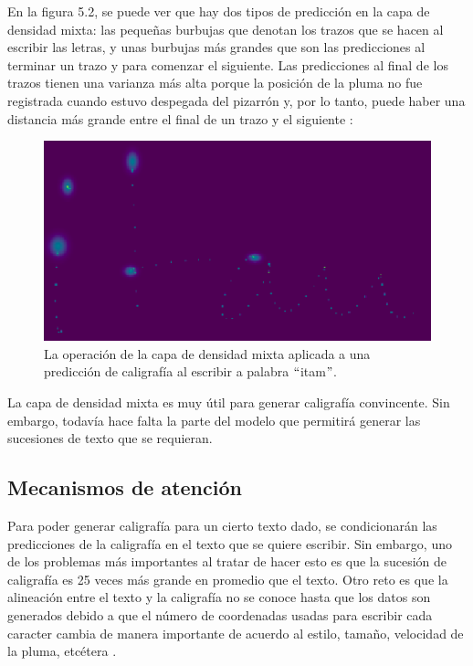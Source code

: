 \vspace{1em}

En la figura 5.2, se puede ver que hay dos tipos de predicción en la capa de densidad mixta: las pequeñas burbujas que denotan los trazos que se hacen al escribir las letras, y unas burbujas más grandes que son las predicciones al terminar un trazo y para comenzar el siguiente. Las predicciones al final de los trazos tienen una varianza más alta porque la posición de la pluma no fue registrada cuando estuvo despegada del pizarrón y, por lo tanto, puede haber una distancia más grande entre el final de un trazo y el siguiente \cite{DBLP:journals/corr/Graves13}:

\begin{figure}[h]
\begin{center}
\includegraphics[width=150mm, scale = 0.8]{./imag/mdn.png}
\end{center}
\caption{La operación de la capa de densidad mixta aplicada a una predicción de caligrafía al escribir a palabra $``$itam$"$.}
\end{figure}

\vspace{1em}

La capa de densidad mixta es muy útil para generar caligrafía convincente. Sin embargo, todavía hace falta la parte del modelo que permitirá generar las sucesiones de texto que se requieran.

\subsection{Mecanismos de atención}
Para poder generar caligrafía para un cierto texto dado, se condicionarán las predicciones de la caligrafía en el texto que se quiere escribir. Sin embargo, uno de los problemas más importantes al tratar de hacer esto es que la sucesión de caligrafía es 25 veces más grande en promedio que el texto. Otro reto es que la alineación entre el texto y la caligrafía no se conoce hasta que los datos son generados debido a que el número de coordenadas usadas para escribir cada caracter cambia de manera importante de acuerdo al estilo, tamaño, velocidad de la pluma, etcétera \cite{DBLP:journals/corr/Graves13}.

